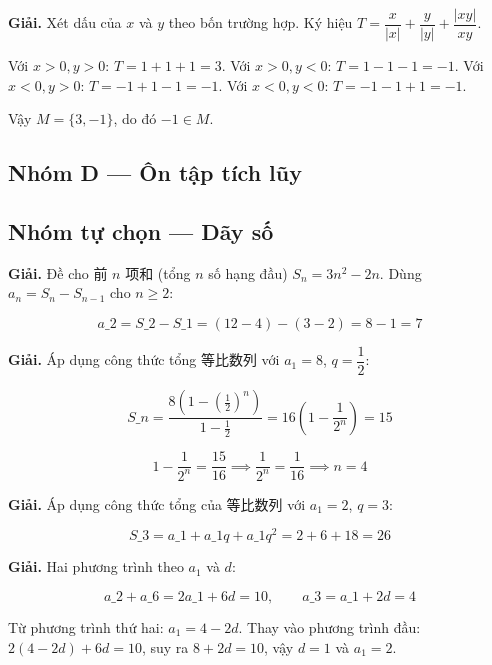 \documentclass[11pt, a4paper]{article}
\begin{document}
\begin{dapan}[25 — Đáp án B]
\textbf{Giải.} Xét dấu của $x$ và $y$ theo bốn trường hợp. Ký hiệu $T = \dfrac{x}{\lvert x \rvert} + \dfrac{y}{\lvert y \rvert} + \dfrac{\lvert xy \rvert}{xy}$.

Với $x > 0, y > 0$: $T = 1 + 1 + 1 = 3$. Với $x > 0, y < 0$: $T = 1 - 1 - 1 = -1$. Với $x < 0, y > 0$: $T = -1 + 1 - 1 = -1$. Với $x < 0, y < 0$: $T = -1 - 1 + 1 = -1$.

Vậy $M = \{3, -1\}$, do đó $-1 \in M$.
\end{dapan}

\subsection*{Nhóm D — Ôn tập tích lũy}

\subsection*{Nhóm tự chọn — Dãy số}

\begin{dapan}[1 — Đáp án B]
\textbf{Giải.} Đề cho 前 $n$ 项和 (tổng $n$ số hạng đầu) $S_n = 3n^2 - 2n$. Dùng $a_n = S_n - S_{n-1}$ cho $n \ge 2$:

$$a\_2 = S\_2 - S\_1 = (12 - 4) - (3 - 2) = 8 - 1 = 7$$
\end{dapan}

\begin{dapan}[2 — Đáp án B]
\textbf{Giải.} Áp dụng công thức tổng 等比数列 với $a_1 = 8$, $q = \dfrac{1}{2}$:

$$S\_n = \frac{8\left(1 - \left(\frac{1}{2}\right)^n\right)}{1 - \frac{1}{2}} = 16\left(1 - \frac{1}{2^n}\right) = 15$$

$$1 - \frac{1}{2^n} = \frac{15}{16} \implies \frac{1}{2^n} = \frac{1}{16} \implies n = 4$$
\end{dapan}

\begin{dapan}[3 — Đáp án B]
\textbf{Giải.} Áp dụng công thức tổng của 等比数列 với $a_1 = 2$, $q = 3$:

$$S\_3 = a\_1 + a\_1 q + a\_1 q^2 = 2 + 6 + 18 = 26$$
\end{dapan}

\begin{dapan}[4 — Đáp án B]
\textbf{Giải.} Hai phương trình theo $a_1$ và $d$:

$$a\_2 + a\_6 = 2a\_1 + 6d = 10, \qquad a\_3 = a\_1 + 2d = 4$$

Từ phương trình thứ hai: $a_1 = 4 - 2d$. Thay vào phương trình đầu: $2(4 - 2d) + 6d = 10$, suy ra $8 + 2d = 10$, vậy $d = 1$ và $a_1 = 2$.
\end{dapan}
\end{document}
